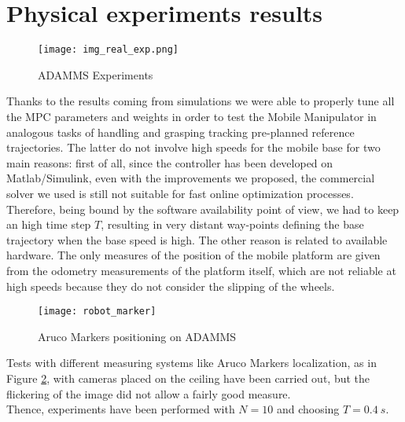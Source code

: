 \section{Physical experiments results}
\begin{figure}[h!]
	\centering
	\texttt{[image: img\_real\_exp.png]}
	\caption{ADAMMS Experiments}
	\label{img_real_exp}
\end{figure}
Thanks to the results coming from simulations we were able to properly tune all the MPC parameters and weights in order to test the Mobile Manipulator in analogous tasks of handling and grasping tracking pre-planned reference trajectories. The latter do not involve high speeds for the mobile base for two main reasons: first of all, since the controller has been developed on Matlab/Simulink, even with the improvements we proposed, the commercial solver we used is still not suitable for fast online optimization processes. Therefore, being bound by the software availability point of view, we had to keep an high time step $T$, resulting in very distant way-points defining the base trajectory when the base speed is high. The other reason is related to available hardware.
The only measures of the position of the mobile platform are given from the odometry measurements of the platform itself, which are not reliable at high speeds because they do not consider the slipping of the wheels. 
\begin{figure}[h!]
	\centering
	\texttt{[image: robot\_marker]}
	\caption{Aruco Markers positioning on ADAMMS}
	\label{robot_marker}
\end{figure} Tests with different measuring systems like Aruco Markers localization, as in Figure \ref{robot_marker}, with cameras placed on the ceiling have been carried out, but the flickering of the image did not allow a fairly good measure.\\
Thence, experiments have been performed with $N=10$ and choosing $T=0.4\ s$.

